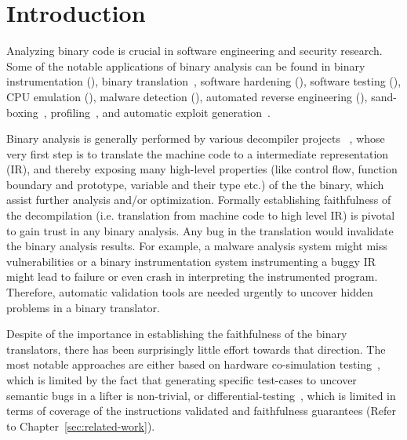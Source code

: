 \chapter{Introduction}\label{sec:ba}

Analyzing binary code is crucial in software engineering and security research.
Some of the notable applications of binary analysis can be found in binary
instrumentation
(\cite{Bruening:CGO2003,PEBIL10,Pin:2005,Valgrind:ENTCS03,DynamoRIO:2004}),
  binary translation~\cite{UQBT:2000}, software hardening
  (\cite{Cha:2015,Ford:2008,Zhang,Zhang:2013}), software testing
  (\cite{Chipounov:2011,Avgerinos:2014,godefroid_automated_2008}), CPU
  emulation (\cite{QEMU:USENIX05,Magnusson:2002}), malware detection
  (\cite{Christodorescu:2005,Kruegel:2004,BitBlaze:2008,BAP:CAV11,Egele:USENIX07,Yin:CCS07}),
  automated reverse engineering
  (\cite{Cui:2008,Lin:2008,Schwartz:2013,Yakdan2015NDSS,McSema:Recon14,Angr,Radare2}),
  sand-boxing~\cite{Kiriansky:2002:SEV,Erlingsson:2006,Yee:2009},
  profiling~\cite{Harris:2005,Srivastava:1994}, and automatic exploit
  generation~\cite{Cha:2012}.
               
                 Binary analysis is generally performed by various decompiler
                 projects
                 ~\cite{McSema:Recon14,Remill,Angr1,BAP:CAV11,Radare2}, whose
                 very first step is to translate the machine code to a
                 intermediate representation (IR), and thereby exposing many
                 high-level properties (like control flow, function boundary
                     and prototype, variable and their type etc.) of the the
                 binary, which  assist further analysis and/or optimization.
                 Formally establishing faithfulness of the decompilation (i.e.
                     translation from machine code to high level IR) is pivotal
                 to gain trust in any binary analysis. Any bug in the
                 translation would invalidate the binary analysis results.  For
                 example, a malware analysis system might miss vulnerabilities
                 or a binary instrumentation system instrumenting a buggy IR
                 might lead to failure or even crash in interpreting the
                 instrumented program. Therefore, automatic validation tools
                 are needed urgently to uncover hidden problems in a binary
                 translator. 

Despite of the importance in establishing the faithfulness of the binary
translators, there has been surprisingly little effort towards that direction.
The most notable approaches are either based on hardware co-simulation
testing~\cite{Martignoni:ISSTA2009,Martignoni:ISSTA2010}, which is limited by
the fact that generating specific test-cases to uncover semantic bugs in a
lifter is non-trivial, or
differential-testing~\cite{Martignoni:ASPLOS2012,ASE2017}, which is limited in
terms of coverage of the instructions validated and faithfulness guarantees
(Refer to Chapter~\ref{sec:related-work}). 

